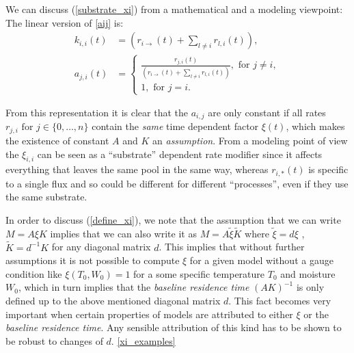 We can discuss (\ref{substrate_xi}) from a mathematical and a modeling viewpoint:
\newcommand{\kiit}{
      \left(
      r_{i \rightarrow } (t)
      + 
      \sum_{l \ne i} r_{l,i} (t)
      \right)
}
The linear version of \eqref{aij} is: 
\begin{align}
  k_{i,i}(t) &=\kiit, \nonumber
  \\
  a_{j,i}(t) &=\left\{
  \begin{matrix}
  \frac{
    r_{j,i} (t)
  }{
    \kiit
  }, \text{ for } j \ne i,
  \\
  1, \text{ for } j=i.
  \end{matrix}
  \right.
  \label{aij}
\end{align}

From this representation it is clear that the $a_{i,j}$  are only constant if all rates $r_{j,i} \text{ for } j \in \{0,\dots ,n \}$ contain the \emph{same} time dependent factor $\xi(t)$, which makes the existence of constant $A$ and $K$ 
an \emph{assumption}.
From a modeling point of view the $\xi_{i,i}$ can be seen as a ``substrate'' dependent rate modifier since it affects everything that leaves the same pool in the same way, whereas $r_{i,*}(t)$ is specific to a single flux and so could be different for different ``processes'', even if they use the same substrate.

In order to discuss (\ref{define_xi}), we note that the assumption that we can write 
$M=A \xi K$ implies that we can also write it as $M=A \tilde{\xi} \tilde{K}$
where $\tilde{\xi}=d\xi$ , $\tilde{K}=d^{-1} K$ for any diagonal matrix $d$.
This implies that without further assumptions it is not possible to compute $\xi$
for a given model without a gauge condition like $\xi(T_0, W_0)=1$ for a some
specific temperature $T_0$ and moisture $W_0$, which in turn implies that the {\it baseline residence time } $(A K)^{-1}$
is only defined up to the above mentioned diagonal matrix $d$.
This fact becomes very important when certain properties of models are attributed to either $\xi$ or the {\it baseline residence time}.
Any sensible attribution of this kind has to be shown to be robust to changes of $d$.
\ref{xi_examples}
%



